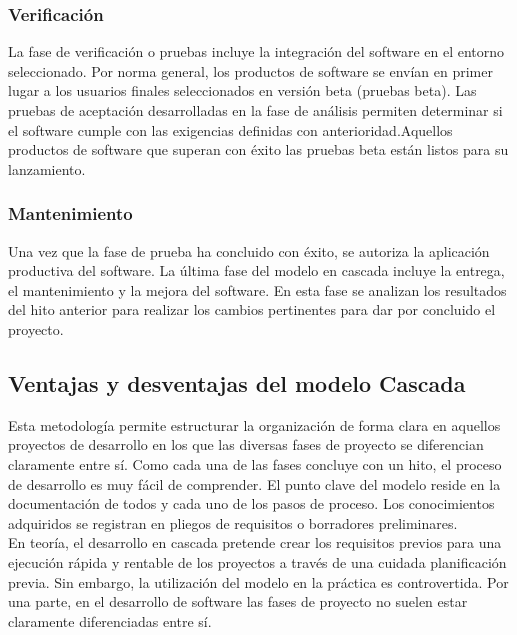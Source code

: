 \subsubsection{Verificación}
La fase de verificación o pruebas incluye la integración del software en el entorno seleccionado. Por norma general, los productos de software se envían en primer lugar a los usuarios finales seleccionados en versión beta (pruebas beta). Las pruebas de aceptación desarrolladas en la fase de análisis permiten determinar si el software cumple con las exigencias definidas con anterioridad.Aquellos productos de software que superan con éxito las pruebas beta están listos para su lanzamiento.\\

\subsubsection{Mantenimiento}

Una vez que la fase de prueba ha concluido con éxito, se autoriza la aplicación productiva del software. La última fase del modelo en cascada incluye la entrega, el mantenimiento y la mejora del software. En esta fase se analizan los resultados del hito anterior para realizar los cambios pertinentes para dar por concluido el proyecto.\\

\subsection{Ventajas y desventajas del modelo Cascada}
Esta metodología permite estructurar la organización de forma clara en aquellos proyectos de desarrollo en los que las diversas fases de proyecto se diferencian claramente entre sí. Como cada una de las fases concluye con un hito, el proceso de desarrollo es muy fácil de comprender. El punto clave del modelo reside en la documentación de todos y cada uno de los pasos de proceso. Los conocimientos adquiridos se registran en pliegos de requisitos o borradores preliminares.\\

En teoría, el desarrollo en cascada pretende crear los requisitos previos para una ejecución rápida y rentable de los proyectos a través de una cuidada planificación previa. Sin embargo, la utilización del modelo en la práctica es controvertida. Por una parte, en el desarrollo de software las fases de proyecto no suelen estar claramente diferenciadas entre sí.\\

